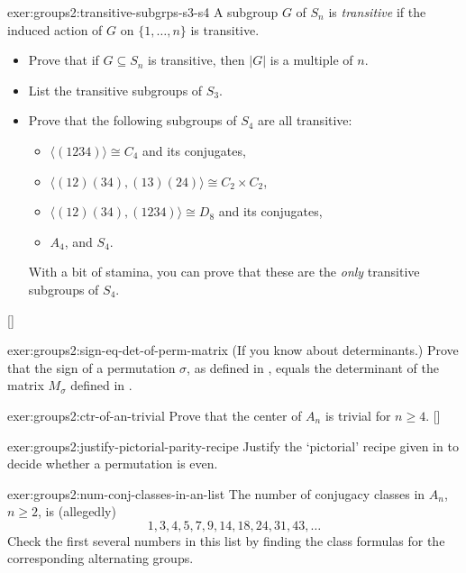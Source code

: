 \begin{exer}{}{exer:groups2:transitive-subgrps-s3-s4}
  \exerused{} A subgroup $G$ of $S_n$ is \emph{transitive} if the
  induced action of $G$ on $\{1, \dots, n\}$ is transitive.
  \begin{itemize}
  \item Prove that if $G \subseteq S_n$ is transitive, then $|G|$ is a
    multiple of $n$.
  \item List the transitive subgroups of $S_3$.
  \item Prove that the following subgroups of $S_4$ are all
    transitive:
    \begin{itemize}
    \item[$-$] $\langle(1234)\rangle \cong C_4$ and its conjugates,
    \item[$-$]
      $\langle(12)(34), (13)(24)\rangle \cong C_2 \times C_2$,
    \item[$-$] $\langle(12)(34), (1234)\rangle \cong D_8$ and its
      conjugates,
    \item[$-$] $A_4$, and $S_4$.
    \end{itemize}
    With a bit of stamina, you can prove that these are the
    \emph{only} transitive subgroups of $S_4$.
  \end{itemize} []
\end{exer}
\begin{exer}{}{exer:groups2:sign-eq-det-of-perm-matrix}
  (If you know about determinants.) Prove that the sign of a
  permutation $\sigma$, as defined in , equals
  the determinant of the matrix $M_\sigma$ defined in
  .
\end{exer}
\begin{exer}{}{exer:groups2:ctr-of-an-trivial}
  \exerused{} Prove that the center of $A_n$ is trivial for
  $n \geq 4$.  []
\end{exer}
\begin{exer}{}{exer:groups2:justify-pictorial-parity-recipe}
  Justify the `pictorial' recipe given in
  to decide whether a permutation is even.
\end{exer}
\begin{exer}{}{exer:groups2:num-conj-classes-in-an-list}
  The number of conjugacy classes in $A_n$, $n \geq 2$, is (allegedly)
  \[
    1, 3, 4, 5, 7, 9, 14, 18, 24, 31, 43, \dots
  \]
  Check the first several numbers in this list by finding the class
  formulas for the corresponding alternating groups.
\end{exer}
